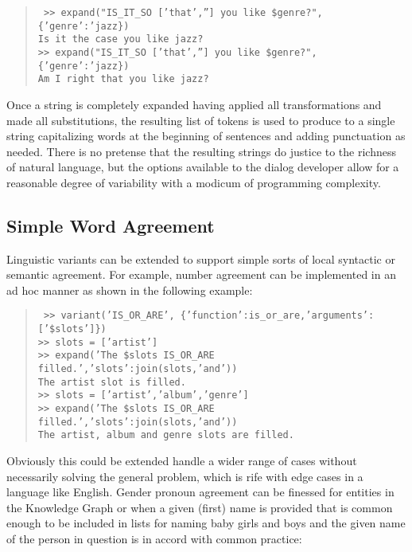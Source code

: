 \documentclass[letterpaper,12pt]{article}
\begin{document}
\begin{quotation} \tt
%
  >> expand("IS_IT_SO ['that',''] you like \$genre?", \{'genre':'jazz\})\\
  Is it the case you like jazz?\\
  >> expand("IS_IT_SO ['that',''] you like \$genre?", \{'genre':'jazz\})\\
  Am I right that you like jazz?\\
%
\end{quotation}

Once a string is completely expanded having applied all transformations and made all substitutions, the resulting list of tokens is used to produce to a single string capitalizing words at the beginning of sentences and adding punctuation as needed. 
%
There is no pretense that the resulting strings do justice to the richness of natural language, but the options available to the dialog developer allow for a reasonable degree of variability with a modicum of programming complexity. 

\subsection*{Simple Word Agreement}

Linguistic variants can be extended to support simple sorts of local syntactic or semantic agreement. For example, number agreement can be implemented in an ad hoc manner as shown in the following example:

\begin{quotation} \tt
%
  >> variant('IS_OR_ARE', \{'function':is_or_are,'arguments':['\$slots']\})\\
  >> slots = ['artist']\\
  >> expand('The \$slots IS_OR_ARE filled.',{'slots':join(slots,'and')})\\
  The artist slot is filled.\\
  >> slots = ['artist','album','genre']\\
  >> expand('The \$slots IS_OR_ARE filled.',{'slots':join(slots,'and')})\\
  The artist, album and genre slots are filled.\\
%
\end{quotation}

Obviously this could be extended handle a wider range of cases without necessarily solving the general problem, which is rife with edge cases in a language like English. Gender pronoun agreement can be finessed for entities in the Knowledge Graph or when a given (first) name is provided that is common enough to be included in lists for naming baby girls and boys and the given name of the person in question is in accord with common practice:
\end{document}
